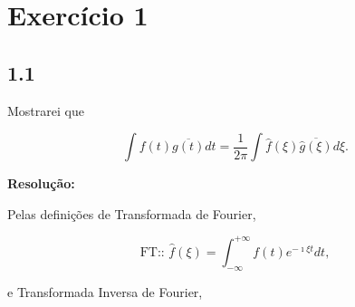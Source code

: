 
\section*{\large Exercício 1}
%



\subsection*{1.1} 
%

Mostrarei que 

\begin{equation*}
\int f(t)\overline{g(t)} dt = \frac{1}{2 \pi} \int \hat{f}(\xi)\overline{\hat{g}(\xi)} d\xi.
\end{equation*}

\textbf{Resolução:}

Pelas definições de Transformada de Fourier,

\begin{equation}
\text{FT::  } \hat{f}(\xi) = \int_{-\infty}^{+\infty} f(t) e^{-\imath \xi t}d t,
\label{eq:ft}
\end{equation}

e Transformada Inversa de Fourier,

